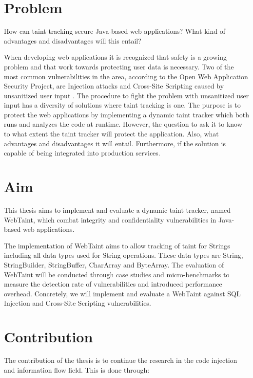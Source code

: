 \section{Problem}
\label{Problem}
\begin{chapquote}{}
    How can taint tracking secure Java-based web applications? What kind of advantages and disadvantages will this entail?
\end{chapquote}

\noindent
When developing web applications it is recognized that safety is a growing problem and that work towards protecting user data is necessary. Two of the most common vulnerabilities in the area, according to the Open Web Application Security Project, are Injection attacks and Cross-Site Scripting caused by unsanitized user input \parencite{OWASP2017}. The procedure to fight the problem with unsanitized user input has a diversity of solutions where taint tracking is one. The purpose is to protect the web applications by implementing a dynamic taint tracker which both runs and analyzes the code at runtime. However, the question to ask it to know to what extent the taint tracker will protect the application. Also, what advantages and disadvantages it will entail. Furthermore, if the solution is capable of being integrated into production services.



\section{Aim}
\label{Aim}
This thesis aims to implement and evaluate a dynamic taint tracker, named WebTaint, which combat integrity and confidentiality vulnerabilities in Java-based web applications. 

The implementation of WebTaint aims to allow tracking of taint for Strings including all data types used for String operations. These data types are String, StringBuilder, StringBuffer, CharArray and ByteArray. The evaluation of WebTaint will be conducted through case studies and micro-benchmarks to measure the detection rate of vulnerabilities and introduced performance overhead. Concretely, we will implement and evaluate a WebTaint against SQL Injection and Cross-Site Scripting vulnerabilities.



\section{Contribution}
\label{Contribution}
The contribution of the thesis is to continue the research in the code injection and information flow field. This is done through:

